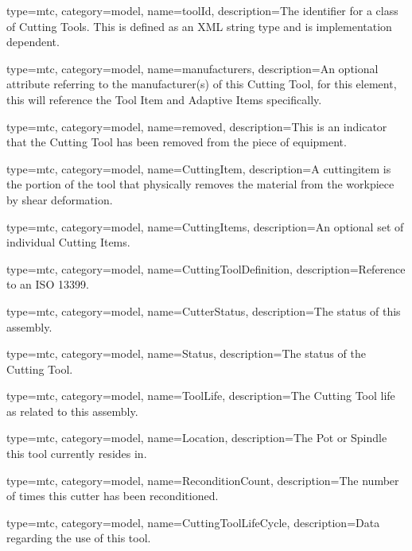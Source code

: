 {
  type=mtc,
  category=model,
  name={toolId},
  description={The identifier for a class of Cutting Tools. This is defined as an XML string type and is implementation dependent. }
}


{
  type=mtc,
  category=model,
  name={manufacturers},
  description={An optional attribute referring to the manufacturer(s) of this Cutting Tool, for this element, this will reference the Tool Item and Adaptive Items specifically. }
}


{
  type=mtc,
  category=model,
  name={removed},
  description={This is an indicator that the Cutting Tool has been removed from the piece of equipment. }
}


{
  type=mtc,
  category=model,
  name={CuttingItem},
  description={A \gls{cuttingitem} is the portion of the tool that physically removes the material from the workpiece by shear deformation.}
}

{
  type=mtc,
  category=model,
  name={CuttingItems},
  description={An optional set of individual Cutting Items.}
}

{
  type=mtc,
  category=model,
  name={CuttingToolDefinition},
  description={Reference to an ISO 13399.}
}


{
  type=mtc,
  category=model,
  name={CutterStatus},
  description={The status of this assembly.}
}


{
  type=mtc,
  category=model,
  name={Status},
  description={The status of the Cutting Tool.}
}


{
  type=mtc,
  category=model,
  name={ToolLife},
  description={The Cutting Tool life as related to this assembly.}
}


{
  type=mtc,
  category=model,
  name={Location},
  description={The Pot or Spindle this tool currently resides in.}
}


{
  type=mtc,
  category=model,
  name={ReconditionCount},
  description={The number of times this cutter has been reconditioned.}
}


{
  type=mtc,
  category=model,
  name={CuttingToolLifeCycle},
  description={Data regarding the use of this tool.}
}


